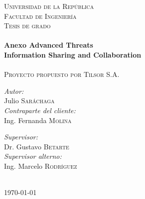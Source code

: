 \pagestyle{empty}
\sffamily

\noindent
\begin{center}
	\textsc{\huge Universidad de la República}\\[1.5cm] %

   \textsc{\LARGE Facultad de Ingeniería}\\[1.5cm] %
   \textsc{\Large Tesis de grado}\\[0.5cm] %
   
   \HRule \\[0.4cm] %
   {\huge \bfseries Anexo Advanced Threats \\ \bigskip Information Sharing and Collaboration}\\[0.4cm] %
   \HRule \\[1.5cm] %
   
   \textsc{\large Proyecto propuesto por Tilsor S.A.}\\[1.5cm] %

   \begin{minipage}{0.4\textwidth}
   	\begin{flushleft} \large
   		\emph{Autor:}\\
   		{Julio \textsc{Saráchaga}}\\
   		\bigskip
   		\emph{Contraparte del cliente:}\\
   		{Ing. Fernanda \textsc{Molina}} 
   	\end{flushleft}
   \end{minipage}
   \begin{minipage}{0.4\textwidth}
   	\begin{flushright} \large
   		\emph{Supervisor:} \\
   		{Dr. Gustavo \textsc{Betarte}}\\
   		\bigskip
   		\emph{Supervisor alterno:} \\
   		{Ing. Marcelo \textsc{Rodríguez}}
   	\end{flushright}
   \end{minipage}\\[3cm]
   
   {\large \today}\\[4cm] %
   
   \vfill
\end{center}

\cleardoublepage

\rmfamily
\normalfont

\newpage
\pagestyle{empty}
\mbox{}
